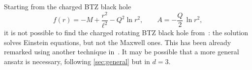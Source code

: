 Starting from the charged BTZ black hole
\begin{equation}
       f(r) = - M + \frac{r^2}{\ell^2} - Q^2 \ln r^2, \qquad
       A = - \frac{Q}{2}\, \ln r^2,
\end{equation} 
it is not possible to find the charged rotating BTZ black hole from~\cites{Clement:1993:ClassicalSolutionsThreedimensional, Clement:1996:SpinningChargedBTZ}[sec.~4.2]{Martinez:2000:ChargedRotatingBlack}: the solution solves Einstein equations, but not the Maxwell ones.
This has been already remarked using another technique in~\cite[app.~B]{Lambert:2014:ConformalSymmetriesGravity}.
It may be possible that a more general ansatz is necessary, following \cref{sec:general} but in $d = 3$.
